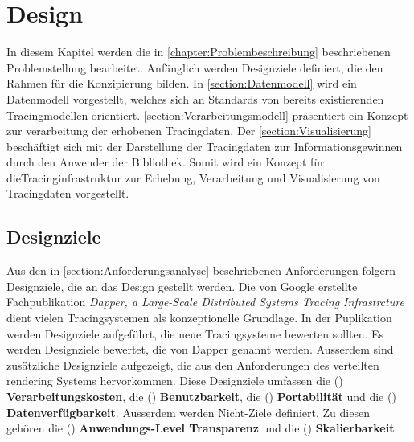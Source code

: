 %

\chapter{Design}
\label{chapter:Design}
In diesem Kapitel werden die in \cref{chapter:Problembeschreibung} beschriebenen Problemstellung bearbeitet. Anfänglich werden Designziele definiert, die den Rahmen für die Konzipierung bilden. In \cref{section:Datenmodell} wird ein Datenmodell vorgestellt, welches sich an Standards von bereits existierenden Tracingmodellen orientiert. \cref{section:Verarbeitungsmodell} präsentiert ein Konzept zur verarbeitung der erhobenen Tracingdaten. Der \cref{section:Visualisierung} beschäftigt sich mit der Darstellung der Tracingdaten zur Informationsgewinnen durch den Anwender der Bibliothek. Somit wird ein Konzept für dieTracinginfrastruktur zur Erhebung, Verarbeitung und Visualisierung von Tracingdaten vorgestellt.

\section{Designziele}
\label{section:Designziele}

Aus den in \cref{section:Anforderungsanalyse} beschriebenen Anforderungen folgern Designziele, die an das Design gestellt werden. Die von Google erstellte Fachpublikation \emph{Dapper, a Large-Scale Distributed Systems Tracing Infrastrcture} dient vielen Tracingsystemen als konzeptionelle Grundlage. In der Puplikation werden Designziele aufgeführt, die neue Tracingsysteme bewerten sollten. Es werden Designziele bewertet, die von Dapper genannt werden. Ausserdem sind zusätzliche Designziele aufgezeigt, die aus den Anforderungen des verteilten rendering Systems hervorkommen. Diese Designziele umfassen die () \textbf{Verarbeitungskosten}, die () \textbf{Benutzbarkeit}, die () \textbf{Portabilität} und die () \textbf{Datenverfügbarkeit}. Ausserdem werden Nicht-Ziele definiert. Zu diesen gehören die () \textbf{Anwendungs-Level Transparenz} und die () \textbf{Skalierbarkeit}.

